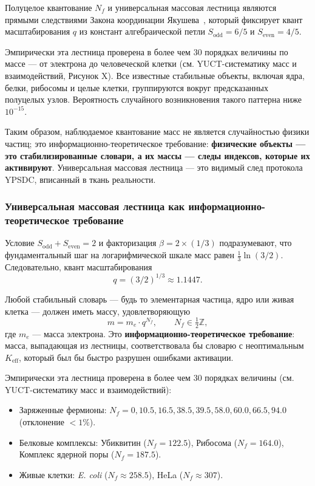 \documentclass[12pt,a4paper]{article}
\theoremstyle{remark}
\begin{document}
	Полуцелое квантование \(N_f\) и универсальная массовая лестница являются прямыми следствиями Закона координации Якушева~\cite{YakushevLaw2026}, который фиксирует квант масштабирования \(q\) из констант алгебраической петли \(S_{\mathrm{odd}} = 6/5\) и \(S_{\mathrm{even}} = 4/5\).
	
	Эмпирически эта лестница проверена в более чем 30 порядках величины по массе — от электрона до человеческой клетки (см. YUCT-систематику масс и взаимодействий, Рисунок X). Все известные стабильные объекты, включая ядра, белки, рибосомы и целые клетки, группируются вокруг предсказанных полуцелых узлов. Вероятность случайного возникновения такого паттерна ниже \(10^{-15}\).
	
	Таким образом, наблюдаемое квантование масс не является случайностью физики частиц; это информационно-теоретическое требование: \textbf{физические объекты — это стабилизированные словари, а их массы — следы индексов, которые их активируют}. Универсальная массовая лестница — это видимый след протокола YPSDC, вписанный в ткань реальности.
	
	\subsubsection{Универсальная массовая лестница как информационно-теоретическое требование}
	
	Условие \(S_{\mathrm{odd}} + S_{\mathrm{even}} = 2\) и факторизация \(\beta = 2 \times (1/3)\) подразумевают, что фундаментальный шаг на логарифмической шкале масс равен \(\frac{1}{3}\ln(3/2)\). Следовательно, квант масштабирования
	\[
	q = (3/2)^{1/3} \approx 1.1447.
	\]
	
	Любой стабильный словарь — будь то элементарная частица, ядро или живая клетка — должен иметь массу, удовлетворяющую
	\[
	m = m_e \cdot q^{N_f}, \qquad N_f \in \tfrac{1}{2}\mathbb{Z},
	\]
	где \(m_e\) — масса электрона. Это \textbf{информационно-теоретическое требование}: масса, выпадающая из лестницы, соответствовала бы словарю с неоптимальным \(K_{\mathrm{eff}}\), который был бы быстро разрушен ошибками активации.
	
	Эмпирически эта лестница проверена в более чем 30 порядках величины (см. YUCT-систематику масс и взаимодействий):
	\begin{itemize}
		\item Заряженные фермионы: \(N_f = 0, 10.5, 16.5, 38.5, 39.5, 58.0, 60.0, 66.5, 94.0\) (отклонение \(< 1\%\)).
		\item Белковые комплексы: Убиквитин (\(N_f = 122.5\)), Рибосома (\(N_f = 164.0\)), Комплекс ядерной поры (\(N_f = 187.5\)).
		\item Живые клетки: \textit{E. coli} (\(N_f \approx 258.5\)), HeLa (\(N_f \approx 307\)).
	\end{itemize}
	
\end{document}
